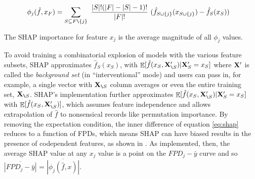 \documentclass[smallextended]{svjour3}       %
\newcommand{\figref}[1]{Figure~\ref{#1}}
\newcommand{\cut}[1]{}
\renewcommand{\slash}{\texttt{\char`\\}}
\DeclareMathOperator{\Ex}{\mathbb{E}}
\begin{document}
\begin{equation}\label{eq:shap}
\phi_j(\hat{f},x_F) = \sum_{S \subseteq F \slash \{j\}}\
\frac{|S|!(|F|-|S|-1)!}{|F|!}\
 ( \hat{f}_{S \cup \{j\}}(x_{S \cup \{j\}}) - \hat{f}_S(x_S) )
\end{equation}\vspace{-1mm}

\noindent The SHAP importance for feature $x_j$ is the average magnitude of all $\phi_j$ values.  

To avoid training a combinatorial explosion of models with the various feature subsets, SHAP approximates $\hat{f}_S(x_S)$, with $\Ex[\hat{f}(x_{S},{\bf X}_{\slash S}') | {\bf X}_S' = x_S]$ where ${\bf X'}$ is called the {\em background set} (in ``interventional'' mode) and users can pass in, for example, a single vector with ${\bf X}_{\slash S}$ column averages or even the entire training set, ${\bf X}_{\slash S}$.  SHAP's implementation further approximates $\Ex[\hat{f}(x_{S},{\bf X}_{\slash S}') | {\bf X}_S' = x_S]$ with $\Ex[\hat{f}(x_{S},{\bf X}_{\slash S}')]$, which assumes feature independence and allows extrapolation of $\hat{f}$ to nonsensical records like permutation importance. By removing the expectation condition, the inner difference of equation \eqref{eq:shap} reduces to a function of FPDs, which means SHAP can have biased results in the presence of codependent features, as shown in \cite{stratpd}.  As implemented, then, the average SHAP value at any $x_j$ value is a point on the $FPD_j - \bar{y}$ curve and so $\overline{|FPD_j-\bar{y}|}$ = $\overline{|\phi_j(\hat{f},x)|}$. 

\cut{
\begin{figure}[htbp]
\centering
\texttt{[image: images/FPD-SHAP-PD.pdf]}\vspace{-3mm}
\caption{\small Partial dependence plots of $n=1000$ data generated from noiseless $y = x_1^2 + x_1 x_2 + 5 x_1 sin(3 x_2) + 10$ where $x_1,x_2,x_3 \sim U(0,10)$ and $x_3$ does not affect $y$. The model is a RF with 30 trees trained on all data (training $R^2=0.997$, Out-of-bag $R^2=0.968$). SHAP used all $\bf X$ as background data.}
\label{fig:FPD_vs_SHAP}
\end{figure}

If we assume for the moment that all features are independent, there is a simple relationship between SHAP and mean-centered FPDs, the partial dependence curves as originally defined by Friedman.  \figref{fig:FPD_vs_SHAP}a and \figref{fig:FPD_vs_SHAP}b illustrate a clear similarity between FPD-$\bar{y}$ and a plot of SHAP values $(x_j^{(i)}, \phi(\hat{f},x_j^{(i)}))$. 
}
\end{document}
